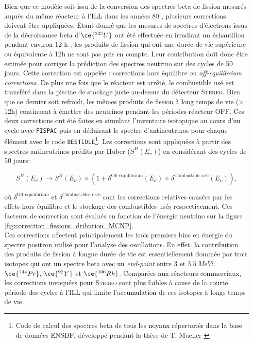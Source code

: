 Bien que ce modèle soit issu de la conversion des spectres beta de fission mesurés auprès du même réacteur à l'ILL dans les années 80 \cite{Schreckenbach:1985ep, VonFeilitzsch:1982jw}, plusieurs corrections doivent être appliquées. \'Etant donné que les mesures de spectres d'électrons issus de la décroissance beta d'$\ce{^{235}U}$ ont été effectuée en irradiant un échantillon pendant environ 12 h \cite{Schreckenbach:1985ep}, les produits de fission qui ont une durée de vie supérieure ou équivalente à 12h ne sont pas pris en compte. Leur contribution doit donc être estimée pour corriger la prédiction des spectres neutrino sur des cycles de 50 jours. Cette correction est appelée : \og corrections hors équilibre \fg{} ou \og \textit{off-equilibrium corrections}\fg{}. De plus une fois que le réacteur est arrêté, le combustible usé est transféré dans la piscine de stockage juste au-dessus du détecteur \textsc{Stereo}. Bien que ce dernier soit refroidi, les mêmes produits de fission à long temps de vie (> 12h) continuent à émettre des neutrinos pendant les périodes réacteur OFF. Ces deux corrections ont été faites en simulant l'inventaire isotopique au cours d'un cycle avec \texttt{FISPAC} puis en déduisant le spectre d'antineutrinos pour chaque élément avec le code \texttt{BESTIOLE}\footnote{Code de calcul des spectres beta de tous les noyaux répertoriés dans la base de données ENSDF, développé pendant la thèse de T. Mueller \cite{Mueller:2010mja}}. Les corrections sont appliquées à partir des spectres antineutrinos prédits par Huber ($S^H(E_\nu)$) en considérant des cycles de 50 jours:

\begin{equation}
\label{eq:corrected_huber_spectrum}
    S^H(E_\nu) \rightarrow S^H(E_\nu) \times \left( 1 + \delta^\textrm{Off-equilibrium} (E_\nu) + \delta^\textrm{Combustible usé} (E_\nu) \right),
\end{equation}

\bigbreak

\noindent
où $\delta^\textrm{Off-equilibrium}$ et $\delta^\textrm{Combustibles usés}$ sont les corrections relatives causées par les effets hors équilibre et le stockage des combustibles usés respectivement. Ces facteurs de correction sont évalués en fonction de l'énergie neutrino sur la figure \ref{fig:correction_fissions_dribution_MCNP}.\\

Ces corrections affectent principalement les trois premiers bins en énergie du spectre positron utilisé pour l'analyse des oscillations. En effet, la contribution des produits de fission à longue durée de vie est essentiellement dominée par trois isotopes qui ont un spectre beta avec un \textit{end-point} entre 3 et $\SI{3.5}{MeV}$: $\ce{^{144}Pr}$, $\ce{^{92}Y}$ et $\ce{^{106}Rh}$. Comparées aux réacteurs commerciaux, les corrections invoquées pour \textsc{Stereo} sont plus faibles à cause de la courte période des cycles à l'ILL qui limite l'accumulation de ces isotopes à longs temps de vie.\\

